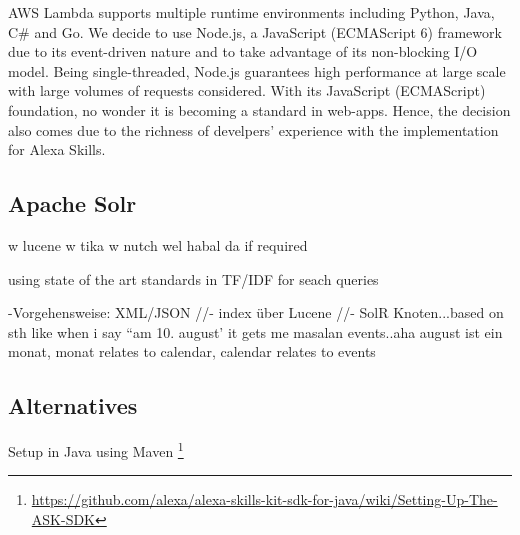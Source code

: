AWS Lambda supports multiple runtime environments including Python, Java, C\# and Go. We decide to use Node.js, a JavaScript (ECMAScript 6) framework due to its event-driven nature and to take advantage of its non-blocking I/O model. Being single-threaded, Node.js guarantees high performance at large scale with large volumes of requests considered. With its JavaScript (ECMAScript) foundation, no wonder it is becoming a standard in web-apps. Hence, the decision also comes due to the richness of develpers' experience with the implementation for Alexa Skills.


\subsection*{Apache Solr}
w lucene w tika w nutch wel habal da if required

using state of the art standards in TF/IDF for seach queries

-Vorgehensweise: XML/JSON //- index über Lucene //- SolR Knoten...based on sth like when i say  ``am 10. august'  it gets me masalan events..aha august ist ein monat, monat relates to calendar, calendar relates to events





\subsection*{Alternatives}
Setup in Java using Maven \footnote{\url{https://github.com/alexa/alexa-skills-kit-sdk-for-java/wiki/Setting-Up-The-ASK-SDK}}

